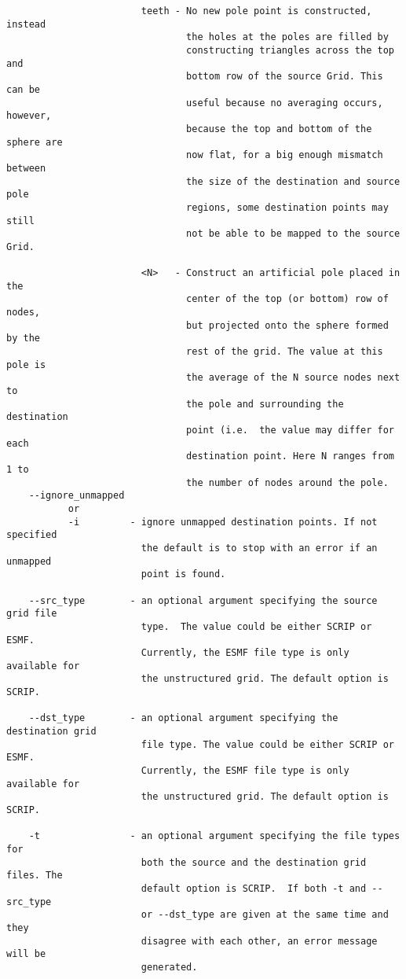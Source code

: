 \begin{verbatim}
                        teeth - No new pole point is constructed, instead 
                                the holes at the poles are filled by 
                                constructing triangles across the top and 
                                bottom row of the source Grid. This can be 
                                useful because no averaging occurs, however, 
                                because the top and bottom of the sphere are 
                                now flat, for a big enough mismatch between 
                                the size of the destination and source pole 
                                regions, some destination points may still 
                                not be able to be mapped to the source Grid. 

                        <N>   - Construct an artificial pole placed in the 
                                center of the top (or bottom) row of nodes, 
                                but projected onto the sphere formed by the 
                                rest of the grid. The value at this pole is 
                                the average of the N source nodes next to
                                the pole and surrounding the destination 
                                point (i.e.  the value may differ for each 
                                destination point. Here N ranges from 1 to 
                                the number of nodes around the pole. 
    --ignore_unmapped
           or 
           -i         - ignore unmapped destination points. If not specified
                        the default is to stop with an error if an unmapped
                        point is found. 

    --src_type        - an optional argument specifying the source grid file 
                        type.  The value could be either SCRIP or ESMF.  
                        Currently, the ESMF file type is only available for 
                        the unstructured grid. The default option is SCRIP.

    --dst_type        - an optional argument specifying the destination grid 
                        file type. The value could be either SCRIP or ESMF.  
                        Currently, the ESMF file type is only available for 
                        the unstructured grid. The default option is SCRIP.

    -t                - an optional argument specifying the file types for 
                        both the source and the destination grid files. The 
                        default option is SCRIP.  If both -t and --src_type 
                        or --dst_type are given at the same time and they 
                        disagree with each other, an error message will be 
                        generated.


\end{verbatim}
